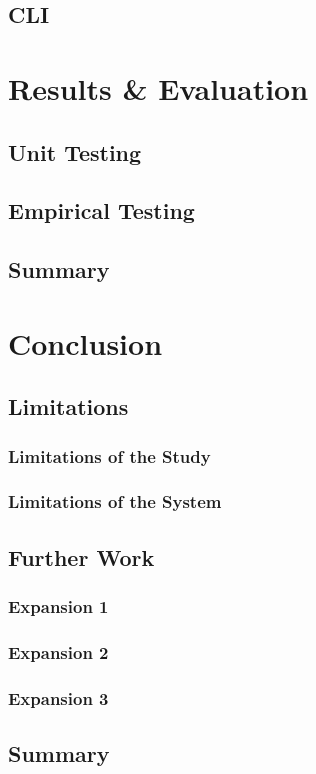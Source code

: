 \documentclass[a4paper, 11pt, twocolumn, twoside]{report}
\begin{document}
\section{CLI}

\chapter{Results \& Evaluation}

\section{Unit Testing}

\section{Empirical Testing}

\section{Summary}

\chapter{Conclusion}

\section{Limitations}

\subsection{Limitations of the Study}

\subsection{Limitations of the System}

\section{Further Work}

\subsection{Expansion 1}

\subsection{Expansion 2}

\subsection{Expansion 3}

\section{Summary}


\end{document}
